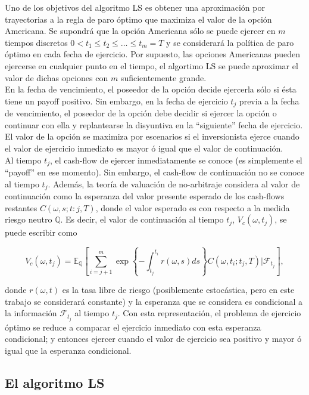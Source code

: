 \documentclass[11pt]{article}
\begin{document}
Uno de los objetivos del algoritmo LS es obtener una aproximación por trayectorias a la regla de paro óptimo que maximiza el valor de la opción 
Americana. Se supondrá que la opción Americana sólo se puede ejercer en $m$ tiempos discretos $0<t_1\leq t_2\leq \ldots \leq t_m=T$ y se considerará la 
política de paro óptimo en cada fecha de ejercicio. Por supuesto, las opciones Americanas pueden ejercerse en cualquier punto en el tiempo, el algortimo LS se puede aproximar el valor de dichas opciones con $m$ suficientemente grande.\\
	
En la fecha de vencimiento, el poseedor de la opción decide ejercerla sólo si ésta tiene un payoff positivo. Sin embargo, en la fecha de ejercicio $t_j$ 
previa a la fecha de vencimiento, el poseedor de la opción debe decidir si ejercer la opción o continuar con ella y replantearse la disyuntiva en la ``siguiente'' fecha de ejercicio.\\
	
El valor de la opción se maximiza por escenarios si el inversionista ejerce  cuando el valor de ejercicio inmediato es mayor ó igual que el valor de continuación.\\
	
Al tiempo $t_j$, el cash-flow de ejercer inmediatamente se conoce (es simplemente el ``payoff'' en ese momento). Sin embargo, el cash-flow de 
continuación no se conoce al tiempo $t_j$. Además, la teoría de valuación de  no-arbitraje considera al valor de continuación como la esperanza del valor 
presente esperado de los cash-flows restantes $C(\omega,s;t:j,T)$,  donde el valor esperado es con respecto a la medida riesgo neutro $\mathbb{Q}$. Es decir, el valor de continuación al tiempo 
$t_j$, $V_c(\omega,t_j)$, se puede escribir como
	
$$V_c(\omega,t_j) = \mathbb{E}_{\mathbb{Q}}\left[\sum_{i=j+1}^m \exp\left\{-\int_{t_j}^{t_i}r(\omega,s)ds\right\}C(\omega,t_i;t_j,T)|\mathcal{F}_{t_j}\right],$$ 

donde $r(\omega,t)$ es la tasa libre de riesgo (posiblemente estocástica, pero en este trabajo se considerará constante) y la esperanza que se considera es condicional a la información  $\mathcal{F}_{t_j}$ al tiempo $t_j$. Con esta representación,  el problema de ejercicio óptimo se reduce a comparar el ejercicio inmediato con esta esperanza condicional; y entonces ejercer cuando el valor de ejercicio sea positivo y mayor ó igual que la esperanza condicional.

\subsection{El algoritmo LS}
	
\end{document}
